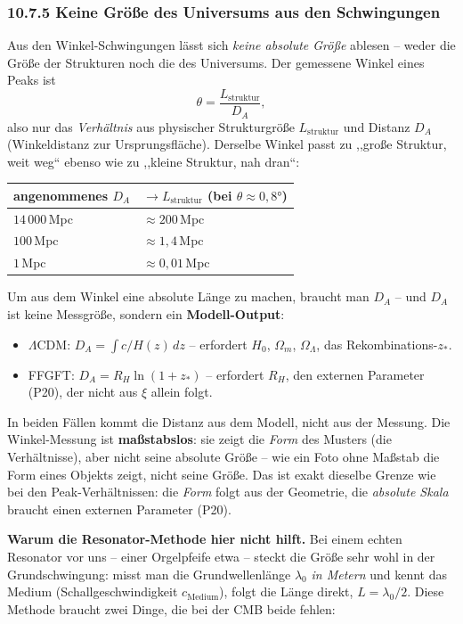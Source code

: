 \subsubsection*{10.7.5 Keine Größe des Universums aus den Schwingungen}

Aus den Winkel-Schwingungen lässt sich \emph{keine absolute Größe}
ablesen -- weder die Größe der Strukturen noch die des Universums.
Der gemessene Winkel eines Peaks ist
\[
  \theta = \frac{L_\mathrm{struktur}}{D_A},
\]
also nur das \emph{Verhältnis} aus physischer Strukturgröße
$L_\mathrm{struktur}$ und Distanz $D_A$ (Winkeldistanz zur
Ursprungsfläche). Derselbe Winkel passt zu ,,große Struktur, weit weg``
ebenso wie zu ,,kleine Struktur, nah dran``:

\begin{center}
\begin{tabular}{p{4cm}p{4cm}}
\toprule
\textbf{angenommenes $D_A$} & \textbf{$\to L_\mathrm{struktur}$ (bei $\theta\approx0{,}8°$)} \\
\midrule
$14\,000$\,Mpc & $\approx 200$\,Mpc \\
$100$\,Mpc & $\approx 1{,}4$\,Mpc \\
$1$\,Mpc & $\approx 0{,}01$\,Mpc \\
\bottomrule
\end{tabular}
\end{center}

Um aus dem Winkel eine absolute Länge zu machen, braucht man $D_A$ --
und $D_A$ ist keine Messgröße, sondern ein \textbf{Modell-Output}:
\begin{itemize}
  \item $\Lambda$CDM: $D_A = \int c/H(z)\,dz$ -- erfordert $H_0$,
        $\Omega_m$, $\Omega_\Lambda$, das Rekombinations-$z_*$.
  \item FFGFT: $D_A = R_H\ln(1+z_*)$ -- erfordert $R_H$, den externen
        Parameter (P20), der nicht aus $\xi$ allein folgt.
\end{itemize}

In beiden Fällen kommt die Distanz aus dem Modell, nicht aus der
Messung. Die Winkel-Messung ist \textbf{maßstabslos}: sie zeigt die
\emph{Form} des Musters (die Verhältnisse), aber nicht seine absolute
Größe -- wie ein Foto ohne Maßstab die Form eines Objekts zeigt, nicht
seine Größe. Das ist exakt dieselbe Grenze wie bei den
Peak-Verhältnissen: die \emph{Form} folgt aus der Geometrie, die
\emph{absolute Skala} braucht einen externen Parameter (P20).

\textbf{Warum die Resonator-Methode hier nicht hilft.} Bei einem echten
Resonator vor uns -- einer Orgelpfeife etwa -- steckt die Größe sehr wohl
in der Grundschwingung: misst man die Grundwellenlänge $\lambda_0$
\emph{in Metern} und kennt das Medium (Schallgeschwindigkeit
$c_\mathrm{Medium}$), folgt die Länge direkt, $L = \lambda_0/2$. Diese
Methode braucht zwei Dinge, die bei der CMB beide fehlen:

